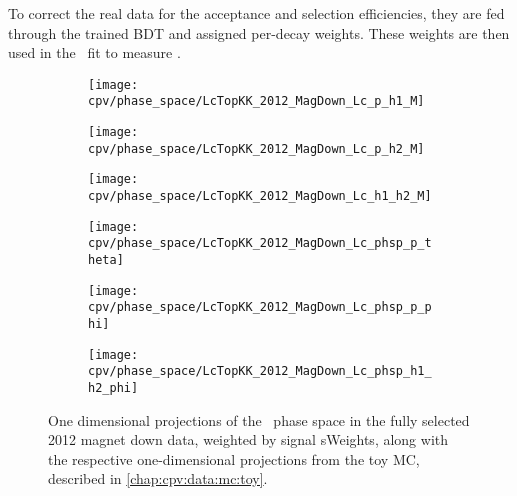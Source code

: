 To correct the real data for the acceptance and selection efficiencies, they 
are fed through the trained \ac{BDT} and assigned per-decay weights.
These weights are then used in the \chisq\ fit to measure \ARaw.

\begin{figure}
  \centering
  \begin{subfigure}{0.4\textwidth}
    \texttt{[image: cpv/phase\_space/LcTopKK\_2012\_MagDown\_Lc\_p\_h1\_M]}
    \label{fig:cpv:phsp:data:pKK:msqphm}
  \end{subfigure}
  \begin{subfigure}{0.4\textwidth}
    \texttt{[image: cpv/phase\_space/LcTopKK\_2012\_MagDown\_Lc\_p\_h2\_M]}
    \label{fig:cpv:phsp:data:pKK:msqphp}
  \end{subfigure}
  \begin{subfigure}{0.4\textwidth}
    \texttt{[image: cpv/phase\_space/LcTopKK\_2012\_MagDown\_Lc\_h1\_h2\_M]}
    \label{fig:cpv:phsp:data:pKK:msqhh}
  \end{subfigure}
  \begin{subfigure}{0.4\textwidth}
    \texttt{[image: cpv/phase\_space/LcTopKK\_2012\_MagDown\_Lc\_phsp\_p\_theta]}
    \label{fig:cpv:phsp:data:pKK:proton_theta}
  \end{subfigure}
  \begin{subfigure}{0.4\textwidth}
    \texttt{[image: cpv/phase\_space/LcTopKK\_2012\_MagDown\_Lc\_phsp\_p\_phi]}
    \label{fig:cpv:phsp:data:pKK:proton_phi}
  \end{subfigure}
  \begin{subfigure}{0.4\textwidth}
    \texttt{[image: cpv/phase\_space/LcTopKK\_2012\_MagDown\_Lc\_phsp\_h1\_h2\_phi]}
    \label{fig:cpv:phsp:data:pKK:h1_h2_phi}
  \end{subfigure}
  \caption{%
    One dimensional projections of the \LcTopKK\ phase space in the fully 
    selected 2012 magnet down data, weighted by signal sWeights, along with the 
    respective one-dimensional projections from the toy \ac{MC}, described in 
    \cref{chap:cpv:data:mc:toy}.
  }
  \label{fig:cpv:phsp:data_1D:pKK}
\end{figure}

